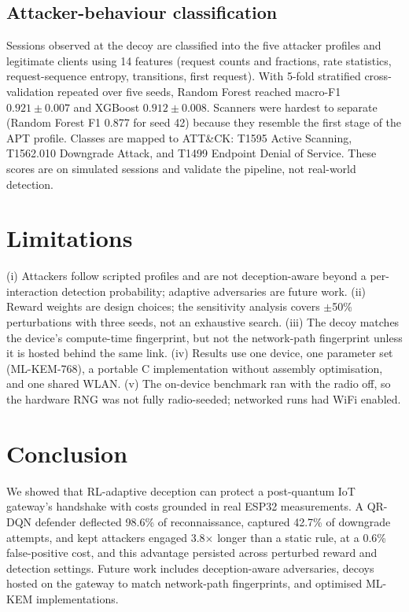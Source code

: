 \documentclass[conference]{IEEEtran}
\begin{document}
\subsection{Attacker-behaviour classification}
Sessions observed at the decoy are classified into the five attacker profiles
and legitimate clients using 14 features (request counts and fractions, rate
statistics, request-sequence entropy, transitions, first request). With 5-fold
stratified cross-validation repeated over five seeds, Random Forest reached
macro-F1 $0.921\pm0.007$ and XGBoost $0.912\pm0.008$. Scanners were hardest to
separate (Random Forest F1 0.877 for seed 42) because they resemble the first
stage of the APT profile.
Classes are mapped to ATT\&CK: T1595 Active Scanning, T1562.010 Downgrade Attack,
and T1499 Endpoint Denial of Service. These scores are on simulated sessions and
validate the pipeline, not real-world detection.

\section{Limitations}
(i) Attackers follow scripted profiles and are not deception-aware beyond a
per-interaction detection probability; adaptive adversaries are future work.
(ii) Reward weights are design choices; the sensitivity analysis covers
$\pm$50\% perturbations with three seeds, not an exhaustive search.
(iii) The decoy matches the device's compute-time fingerprint, but not the
network-path fingerprint unless it is hosted behind the same link.
(iv) Results use one device, one parameter set (ML-KEM-768), a portable C
implementation without assembly optimisation, and one shared WLAN.
(v) The on-device benchmark ran with the radio off, so the hardware RNG was not
fully radio-seeded; networked runs had WiFi enabled.

\section{Conclusion}
We showed that RL-adaptive deception can protect a post-quantum IoT gateway's
handshake with costs grounded in real ESP32 measurements. A QR-DQN defender
deflected 98.6\% of reconnaissance, captured 42.7\% of downgrade attempts, and
kept attackers engaged 3.8$\times$ longer than a static rule, at a 0.6\%
false-positive cost, and this advantage persisted across perturbed reward and
detection settings. Future work includes deception-aware adversaries, decoys
hosted on the gateway to match network-path fingerprints, and optimised ML-KEM
implementations.
\end{document}
